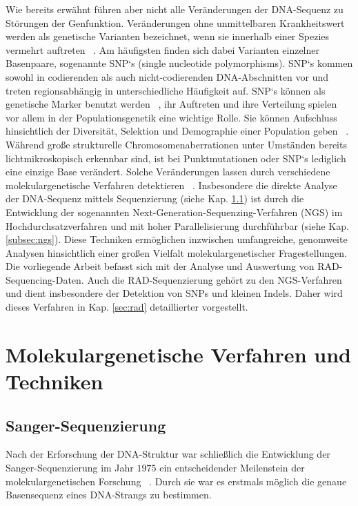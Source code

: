 Wie bereits erwähnt führen aber nicht alle Veränderungen der DNA-Sequenz zu Störungen der Genfunktion. Veränderungen ohne unmittelbaren Krankheitswert werden als genetische Varianten bezeichnet, wenn sie innerhalb einer Spezies vermehrt auftreten ~\cite{vignal_2002, sachidanandam_2001}. Am häufigsten finden sich dabei Varianten einzelner Basenpaare, sogenannte SNP‘s (single nucleotide polymorphisms). SNP‘s kommen sowohl in codierenden als auch nicht-codierenden DNA-Abschnitten vor und treten regionsabhängig in unterschiedliche Häufigkeit auf. SNP‘s können als genetische Marker benutzt werden ~\cite{kruglyak_1997, kwok_2003}, ihr Auftreten und ihre Verteilung spielen vor allem in der Populationsgenetik eine wichtige Rolle. Sie können Aufschluss hinsichtlich der Diversität, Selektion und Demographie einer Population geben ~\cite{nielsen_2004, shriver_2004, akey_2002}. \\

Während große strukturelle Chromosomenaberrationen unter Umständen bereits lichtmikroskopisch erkennbar sind, ist bei Punktmutationen oder SNP‘s lediglich eine einzige Base verändert. Solche Veränderungen lassen durch verschiedene molekulargenetische Verfahren detektieren ~\cite{kwok_2003, wang_1998}. Insbesondere die direkte Analyse der DNA-Sequenz mittels Sequenzierung  (siehe Kap. \ref{subsec:sanger}) ist durch die Entwicklung der sogenannten Next-Generation-Sequenzing-Verfahren (NGS) im Hochdurchsatzverfahren und mit hoher Parallelisierung durchführbar (siehe Kap. \ref{subsec:ngs}). Diese Techniken ermöglichen inzwischen umfangreiche, genomweite Analysen hinsichtlich einer großen Vielfalt molekulargenetischer Fragestellungen. Die vorliegende Arbeit befasst sich mit der Analyse und Auswertung von RAD-Sequencing-Daten. Auch die RAD-Sequenzierung gehört zu den NGS-Verfahren und dient insbesondere der Detektion von SNPs und kleinen Indels. Daher wird dieses Verfahren in Kap. \ref{sec:rad} detaillierter vorgestellt.\\

\section{Molekulargenetische Verfahren und Techniken} \label{sec:methods}
\subsection{Sanger-Sequenzierung} \label{subsec:sanger}

Nach der Erforschung der DNA-Struktur war schließlich die Entwicklung der Sanger-Sequenzierung im Jahr $1975$ ein entscheidender Meilenstein der molekulargenetischen Forschung ~\cite{sanger_1975}. Durch sie war es erstmals möglich die genaue Basensequenz eines DNA-Strangs zu bestimmen. \\

